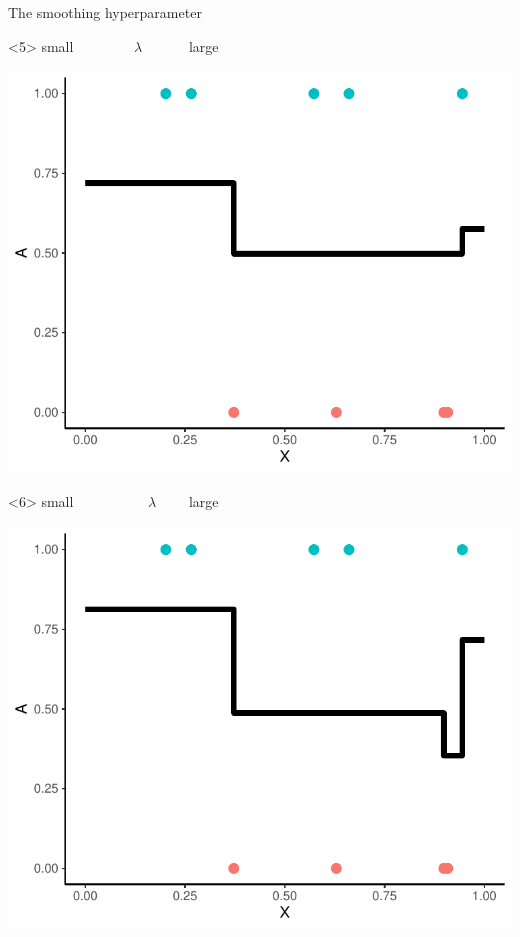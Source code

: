 \documentclass[smaller]{beamer}\usepackage{listings}
\begin{document}
\begin{frame}[label={sec:org990e36d}]{The smoothing hyperparameter}
\begin{onlyenv}<5>
\center small \(\quad \quad \quad \quad   \lambda \quad \quad \quad\) large

\begin{center}
\includegraphics[width=.9\linewidth]{./hal-smoothing3.pdf}
\end{center}
\end{onlyenv}

\begin{onlyenv}<6>
\center small \(\quad \quad \quad \quad \quad   \lambda \quad \quad\) large

\begin{center}
\includegraphics[width=.9\linewidth]{./hal-smoothing4.pdf}
\end{center}
\end{onlyenv}


\end{frame}
\end{document}
